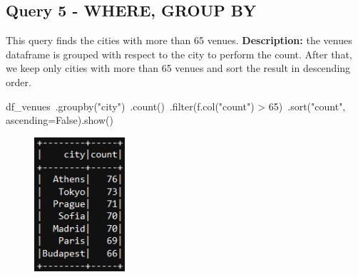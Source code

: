 \documentclass{Configuration_Files/PoliMi3i_thesis}
\begin{document}
\subsection{Query 5 - WHERE, GROUP BY}
This query finds the cities with more than 65 venues.\newline
\textbf{Description:} the venues dataframe is grouped with respect to the city to perform the count. After that, we keep only cities with
more than 65 venues and sort the result in descending order.\newline
\begin{python}
df_venues\
    .groupby("city")\
    .count()\
    .filter(f.col("count") > 65)\
    .sort("count", ascending=False).show()
\end{python}
\begin{figure}[H]
\centering
\includegraphics[width=0.3\textwidth]{query/spark_q5.PNG}
\label{fig:query5}
\end{figure}
\end{document}
